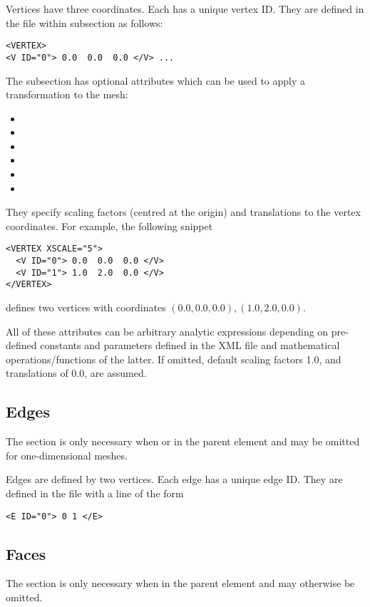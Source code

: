 Vertices have three coordinates. Each has a unique vertex ID. They are defined
in the file within  subsection as follows:
\begin{lstlisting}[style=XMLStyle] <VERTEX>
<V ID="0"> 0.0  0.0  0.0 </V> ...
\end{lstlisting}
The  subsection has optional attributes which can be used to
apply a transformation to the mesh:
\begin{itemize}
    \item {}
    \item {}
    \item {}
    \item {}
    \item {}
    \item {}
\end{itemize}        
They specify scaling factors (centred at the origin) and translations to the
vertex coordinates. For example, the following snippet
\begin{lstlisting}[style=XMLStyle] 
<VERTEX XSCALE="5">
  <V ID="0"> 0.0  0.0  0.0 </V>
  <V ID="1"> 1.0  2.0  0.0 </V>
</VERTEX>
\end{lstlisting}
defines two vertices with coordinates $(0.0,0.0,0.0), (1.0,2.0,0.0)$.

All of these attributes can be arbitrary analytic expressions depending on pre-
defined constants and parameters defined in the XML file and
mathematical operations/functions of the latter. If omitted, default scaling
factors 1.0, and translations of 0.0, are assumed.


\subsection{Edges}
\begin{tipbox}
    The  section is only necessary when  or
     in the parent  element and may be omitted for
    one-dimensional meshes.
\end{tipbox}

Edges are defined by two vertices. Each edge has a unique edge ID. They are
defined in the file with a line of the form 
\begin{lstlisting}[style=XMLStyle]
<E ID="0"> 0 1 </E>
\end{lstlisting}


\subsection{Faces}
\begin{tipbox}
    The  section is only necessary when  in the
    parent  element and may otherwise be omitted.
\end{tipbox}

